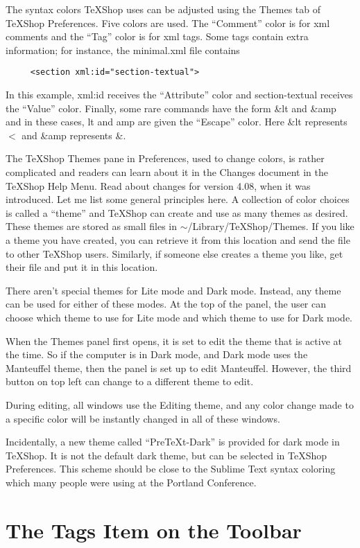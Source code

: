 \documentclass[11pt, oneside]{article}   	%
\begin{document}
The syntax colors TeXShop uses can be adjusted using the Themes tab of TeXShop Preferences. Five colors are used. The ``Comment'' color is for xml comments and the ``Tag'' color is for xml tags. Some tags contain extra information; for instance, the minimal.xml file contains 
\begin{verbatim}
     <section xml:id="section-textual">
\end{verbatim}
In this example, xml:id receives the ``Attribute'' color and section-textual receives the ``Value'' color. Finally,
some rare commands have the form \&lt and \&amp and in these cases, lt and amp are given the ``Escape'' color.
Here \&lt represents $<$ and \&amp represents \&.

The TeXShop Themes pane in Preferences, used to change colors, is rather complicated and readers can learn about it in the Changes document in the TeXShop Help Menu. Read about changes for version 4.08, when it was introduced. Let me  list some general principles here. A collection of color choices is called a ``theme'' and TeXShop can create and use as many themes as desired. These themes are stored as small files in $\sim$/Library/TeXShop/Themes. If you like a theme you have created, you can retrieve it from this location and send the file to other TeXShop users. Similarly, if someone else creates a theme you like, get their file and put it in this location.

There aren't special themes  for Lite mode and Dark mode. Instead, any theme can be used for either of these modes. At the top of the panel, the user can choose which theme to use for Lite mode and which theme to use for Dark mode. 

When the Themes panel first opens, it is set to edit the theme that is active at the time. So if the computer is in Dark mode, and Dark mode uses the Manteuffel theme, then the panel is set up to edit Manteuffel. However, the third button on top left can change to a different theme to edit.

During editing, all windows use the Editing theme, and any color change made to a specific color will be instantly changed in all of these windows.

Incidentally, a new theme called ``PreTeXt-Dark'' is provided for dark mode in TeXShop. It is not the default dark theme, but can be selected in TeXShop Preferences. This scheme should be close to the Sublime Text syntax coloring which many people were using at the Portland Conference.

\section{The Tags Item on the Toolbar}
\end{document}
